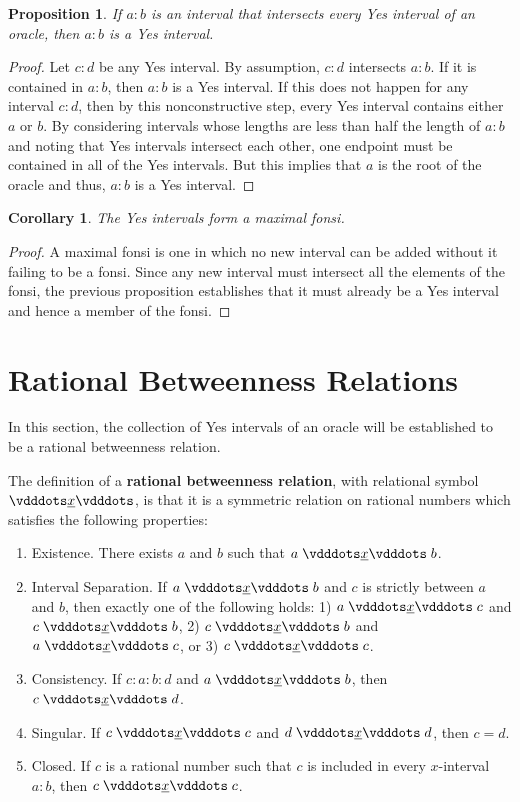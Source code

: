 \documentclass[12pt]{article}
\newtheorem{corollary}{Corollary}[section]
\newtheorem{proposition}{Proposition}[section]
\begin{document}
\begin{proposition}
    If $a:b$ is an interval that intersects every Yes interval of an oracle, then $a:b$ is a Yes interval. 
\end{proposition}

\begin{proof}
    Let $c:d$ be any Yes interval. By assumption, $c:d$ intersects $a:b$. If it is contained in $a:b$, then $a:b$ is a Yes interval. If this does not happen for any interval $c:d$, then by this nonconstructive step, every Yes interval contains either $a$ or $b$. By considering intervals whose lengths are less than half the length of $a:b$ and noting that Yes intervals intersect each other, one endpoint must be contained in all of the Yes intervals. But this implies that $a$ is the root of the oracle and thus, $a:b$ is a Yes interval. 
\end{proof}

\begin{corollary}
    The Yes intervals form a maximal fonsi.
\end{corollary}

\begin{proof}
A maximal fonsi is one in which no new interval can be added without it failing to be a fonsi. Since any new interval must intersect all the elements of the fonsi, the previous proposition establishes that it must already be a Yes interval and hence a member of the fonsi. 
\end{proof}


\section{Rational Betweenness Relations}

In this section, the collection of Yes intervals of an oracle will be established to be a rational betweenness relation. 

The definition of a \textbf{rational betweenness relation}, with relational symbol $\xrel$, is that it is a symmetric relation on rational numbers which satisfies the following properties:
\begin{enumerate}
    \item Existence. There exists $a$ and $b$ such that $a\xrel b$.
    \item Interval Separation. If $a \xrel b$ and $c$ is strictly between $a$ and $b$, then exactly one of the following holds: 1) $a \xrel c$ and \sout{$c \xrel b$}, 2) $c \xrel b$ and \sout{$a \xrel c$}, or 3) $c \xrel c$. 
    \item Consistency. If $c : a : b : d$ and $a \xrel b$, then $c \xrel d$. 
    \item Singular. If $c \xrel c$ and $d \xrel d$, then $c=d$. 
    \item Closed. If $c$ is a rational number such that $c$ is included in every $x$-interval $a:b$, then  $c \xrel c$. 
\end{enumerate}
\end{document}
